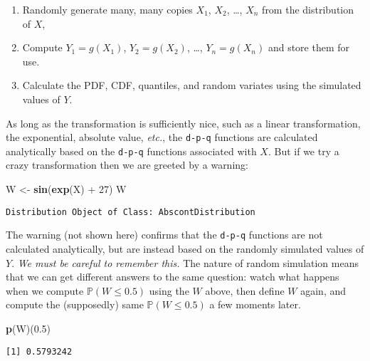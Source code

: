 \documentclass[]{book}
\newenvironment{Shaded}{\begin{snugshade}}{\end{snugshade}}
\newcommand{\KeywordTok}[1]{\textcolor[rgb]{0.13,0.29,0.53}{\textbf{{#1}}}}
\newcommand{\DecValTok}[1]{\textcolor[rgb]{0.00,0.00,0.81}{{#1}}}
\newcommand{\FloatTok}[1]{\textcolor[rgb]{0.00,0.00,0.81}{{#1}}}
\newcommand{\StringTok}[1]{\textcolor[rgb]{0.31,0.60,0.02}{{#1}}}
\newcommand{\NormalTok}[1]{{#1}}
\providecommand{\tightlist}{%
  \setlength{\itemsep}{0pt}\setlength{\parskip}{0pt}}
\numberwithin{equation}{chapter}
\numberwithin{figure}{chapter}
\theoremstyle{plain}
\theoremstyle{definition}
\theoremstyle{remark}
\theoremstyle{definition}
\theoremstyle{definition}
\theoremstyle{remark}
\begin{document}
\begin{enumerate}
\def\labelenumi{\arabic{enumi}.}
\tightlist
\item
  Randomly generate many, many copies \(X_{1}\), \(X_{2}\), \ldots{},
  \(X_{n}\) from the distribution of \(X\),
\item
  Compute \(Y_{1}=g(X_{1})\), \(Y_{2}=g(X_{2})\), \ldots{},
  \(Y_{n}=g(X_{n})\) and store them for use.
\item
  Calculate the PDF, CDF, quantiles, and random variates using the
  simulated values of \(Y\).
\end{enumerate}

As long as the transformation is sufficiently nice, such as a linear
transformation, the exponential, absolute value, \emph{etc.}, the
\texttt{d-p-q} functions are calculated analytically based on the
\texttt{d-p-q} functions associated with \(X\). But if we try a crazy
transformation then we are greeted by a warning:

\begin{Shaded}
\begin{Highlighting}[]
\NormalTok{W <-}\StringTok{ }\KeywordTok{sin}\NormalTok{(}\KeywordTok{exp}\NormalTok{(X) +}\StringTok{ }\DecValTok{27}\NormalTok{)}
\NormalTok{W}
\end{Highlighting}
\end{Shaded}

\begin{verbatim}
Distribution Object of Class: AbscontDistribution
\end{verbatim}

The warning (not shown here) confirms that the \texttt{d-p-q} functions
are not calculated analytically, but are instead based on the randomly
simulated values of \(Y\). \emph{We must be careful to remember this.}
The nature of random simulation means that we can get different answers
to the same question: watch what happens when we compute
\(\mathbb{P}(W\leq0.5)\) using the \(W\) above, then define \(W\) again,
and compute the (supposedly) same \(\mathbb{P}(W\leq0.5)\) a few moments
later.

\begin{Shaded}
\begin{Highlighting}[]
\KeywordTok{p}\NormalTok{(W)(}\FloatTok{0.5}\NormalTok{)}
\end{Highlighting}
\end{Shaded}

\begin{verbatim}
[1] 0.5793242
\end{verbatim}
\end{document}
